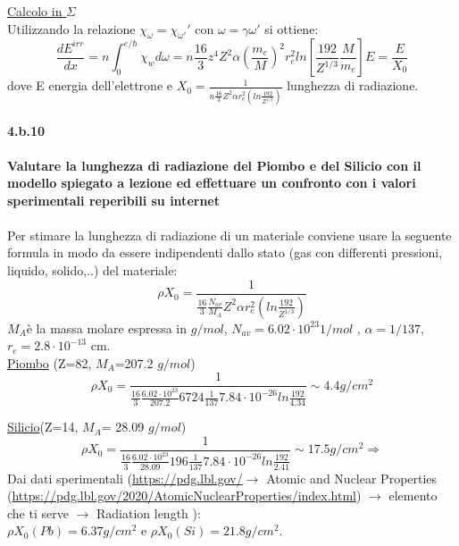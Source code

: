\documentclass[twoside]{article}
\begin{document}
\underline{Calcolo in $\Sigma$}\\
Utilizzando la relazione $\chi_{\omega}=\chi_{\omega'}'$ con $\omega=\gamma\omega'$
si ottiene:
\begin{equation}
    \frac{dE^{irr}}{dx}=n \int_0^{e/\hbar} \chi_w d\omega= n\frac{16}{3}z^4Z^2\alpha \left(\frac{m_e}{M} \right)^2 r_e^2 ln\left[ \frac{192}{Z^{1/3}}\frac{M}{m_e} \right]E =\frac{E}{X_0}
\end{equation}
dove E energia dell'elettrone e $X_0= \frac{1}{n \frac{16}{3} Z^2 \alpha r_e^2 \left(ln\frac{192}{Z^{1/3}}\right)}$ lunghezza di radiazione.

\paragraph{4.b.10}\textbf{Valutare la lunghezza di radiazione del Piombo e del Silicio con il modello spiegato a lezione ed effettuare un confronto con i valori sperimentali reperibili
su internet}\\
\\
Per stimare la lunghezza di radiazione di un materiale conviene usare la seguente formula in modo da essere indipendenti dallo stato (gas con differenti pressioni, liquido, solido,..) del materiale:
\begin{equation}
    \rho X_0= \frac{1}{\frac{16}{3}\frac{N_{av}}{M_A}Z^2\alpha r_e^2\left(ln\frac{192}{Z^{1/3}}\right)}
\end{equation}
$M_A$è la massa molare espressa in $g/mol$, $N_{av}=6.02 \cdot 10^{23} 1/mol$ , $\alpha=1/137$, $r_e=2.8 \cdot 10^{-13}$ cm.\\
\underline{Piombo} (Z=82, $M_A$=207.2 $g/mol$)
\begin{equation*}
\rho X_0=\frac{1}{\frac{16}{3}\frac{6.02 \cdot 10^{23}}{207.2} 6724 \frac{1}{137} 7.84 \cdot 10^{-26}ln\frac{192}{4.34}} \sim 4.4 g/cm^2
\end{equation*}

\underline{Silicio}(Z=14, $M_A$= 28.09 $g/mol$)
\begin{equation*}
\rho X_0=\frac{1}{\frac{16}{3}\frac{6.02 \cdot 10^{23}}{28.09} 196 \frac{1}{137} 7.84 \cdot 10^{-26}ln\frac{192}{2.41}}\sim 17.5 g/cm^2 \Longrightarrow
\end{equation*}
Dai dati sperimentali (\url{https://pdg.lbl.gov/}$\rightarrow$ Atomic and Nuclear Properties (\url{https://pdg.lbl.gov/2020/AtomicNuclearProperties/index.html}) $\rightarrow$ elemento che ti serve $\rightarrow$ Radiation length ):\\
$\rho X_0(Pb)=6.37 g/cm^2$ e $\rho X_0(Si)= 21.8 g/cm^2$. 
\end{document}
